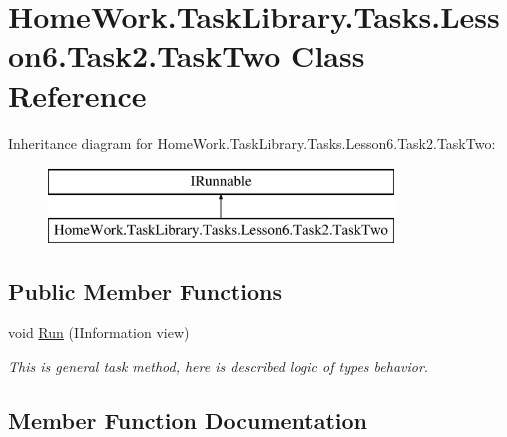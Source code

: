 \hypertarget{class_home_work_1_1_task_library_1_1_tasks_1_1_lesson6_1_1_task2_1_1_task_two}{}\section{Home\+Work.\+Task\+Library.\+Tasks.\+Lesson6.\+Task2.\+Task\+Two Class Reference}
\label{class_home_work_1_1_task_library_1_1_tasks_1_1_lesson6_1_1_task2_1_1_task_two}
Inheritance diagram for Home\+Work.\+Task\+Library.\+Tasks.\+Lesson6.\+Task2.\+Task\+Two\+:\begin{figure}[H]
\begin{center}
\leavevmode
\includegraphics[height=2.000000cm]{class_home_work_1_1_task_library_1_1_tasks_1_1_lesson6_1_1_task2_1_1_task_two}
\end{center}
\end{figure}
\subsection*{Public Member Functions}
\begin{DoxyCompactItemize}
\item 
void \mbox{\hyperlink{class_home_work_1_1_task_library_1_1_tasks_1_1_lesson6_1_1_task2_1_1_task_two_a878f406bc9c56322a4006b478968f7ff}{Run}} (I\+Information view)
\begin{DoxyCompactList}\small\item\em This is general task method, here is described logic of types behavior. \end{DoxyCompactList}\end{DoxyCompactItemize}


\subsection{Member Function Documentation}
\mbox{\label{class_home_work_1_1_task_library_1_1_tasks_1_1_lesson6_1_1_task2_1_1_task_two_a878f406bc9c56322a4006b478968f7ff}} 
